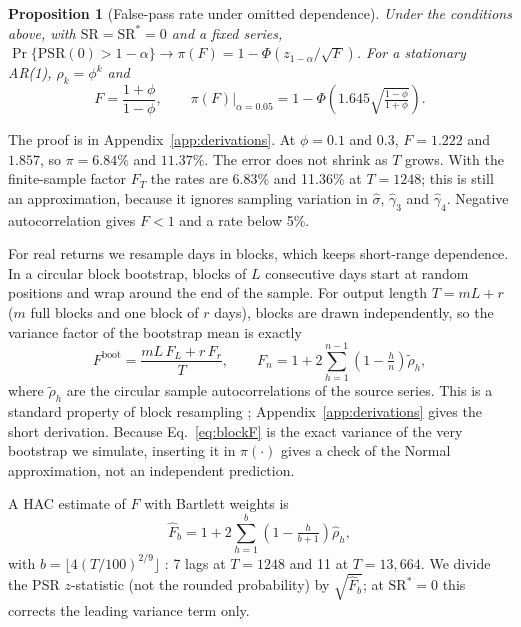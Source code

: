 \documentclass[11pt,a4paper]{article}
\newcommand{\SR}{\mathrm{SR}}
\newtheorem{proposition}{Proposition}
\begin{document}
\begin{proposition}[False-pass rate under omitted dependence]\label{prop:rate}
Under the conditions above, with $\SR=\SR^\ast=0$ and a fixed series, $\Pr\{\mathrm{PSR}(0)>1-\alpha\}\to\pi(F)=1-\Phi\!\left(z_{1-\alpha}/\sqrt F\right)$. For a stationary AR(1), $\rho_k=\phi^k$ and
\begin{equation}\label{eq:ar1rate}
F=\frac{1+\phi}{1-\phi},\qquad \pi(F)\big|_{\alpha=0.05}=1-\Phi\!\left(1.645\sqrt{\tfrac{1-\phi}{1+\phi}}\right).
\end{equation}
\end{proposition}
\noindent The proof is in Appendix~\ref{app:derivations}. At $\phi=0.1$ and $0.3$, $F=1.222$ and $1.857$, so $\pi=6.84\%$ and $11.37\%$. The error does not shrink as $T$ grows. With the finite-sample factor $F_T$ the rates are 6.83\% and 11.36\% at $T=1248$; this is still an approximation, because it ignores sampling variation in $\hat\sigma$, $\hat\gamma_3$ and $\hat\gamma_4$. Negative autocorrelation gives $F<1$ and a rate below 5\%.

For real returns we resample days in blocks, which keeps short-range dependence. In a circular block bootstrap, blocks of $L$ consecutive days start at random positions and wrap around the end of the sample. For output length $T=mL+r$ ($m$ full blocks and one block of $r$ days), blocks are drawn independently, so the variance factor of the bootstrap mean is exactly
\begin{equation}\label{eq:blockF}
F^{\mathrm{boot}}=\frac{mL\,F_L+r\,F_r}{T},\qquad F_n=1+2\sum_{h=1}^{n-1}\left(1-\tfrac{h}{n}\right)\tilde\rho_h ,
\end{equation}
where $\tilde\rho_h$ are the circular sample autocorrelations of the source series. This is a standard property of block resampling \citep{kunsch1989}; Appendix~\ref{app:derivations} gives the short derivation. Because Eq.~\eqref{eq:blockF} is the exact variance of the very bootstrap we simulate, inserting it in $\pi(\cdot)$ gives a check of the Normal approximation, not an independent prediction.

A HAC estimate of $F$ with Bartlett weights \citep{newey1987} is
\begin{equation}\label{eq:nw}
\hat F_b=1+2\sum_{h=1}^{b}\left(1-\tfrac{h}{b+1}\right)\hat\rho_h ,
\end{equation}
with $b=\lfloor4(T/100)^{2/9}\rfloor$ \citep{newey1994}: 7 lags at $T=1248$ and 11 at $T=13{,}664$. We divide the PSR $z$-statistic (not the rounded probability) by $\sqrt{\hat F_b}$; at $\SR^\ast=0$ this corrects the leading variance term only.
\end{document}
